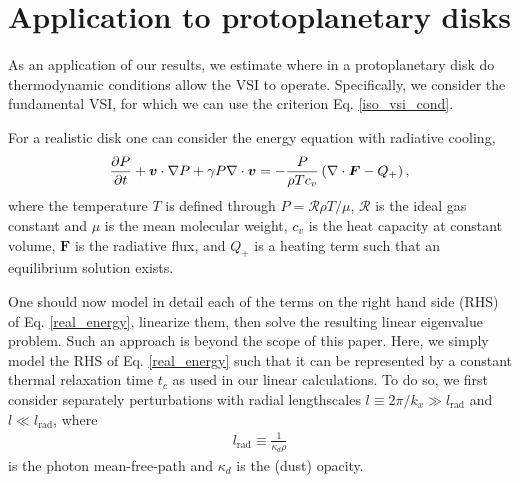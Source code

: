 \section{Application to protoplanetary disks}\label{application} 
As an application of our results, we estimate where in a 
protoplanetary disk do thermodynamic conditions allow the VSI to 
operate. Specifically, we consider the fundamental VSI, 
for which we can use the criterion Eq. \ref{iso_vsi_cond}.   

For a realistic disk one can consider the energy equation with
radiative cooling, 
\begin{align}\label{real_energy}
\frac{\partial P}{\partial t} + \bm{v}\cdot\nabla P +\gamma P \nabla\cdot\bm{v} = - \frac{P}{\rho T
  c_v}\left(\nabla\cdot\bm{F} - Q_+\right), 
\end{align}where the temperature $T$ is defined through $P=\mathcal{R}\rho
T/\mu$, $\mathcal{R}$ is the ideal gas constant and $\mu$ is
the mean molecular weight, $c_v$ is the heat capacity at constant
volume, 
$\bm{F}$ is the radiative flux, and $Q_+$ is a heating
term such that an equilibrium solution exists. 

One should now model in detail each of the terms on the right
hand side (RHS) of Eq. \ref{real_energy}, linearize them, then solve
the resulting linear eigenvalue problem. Such an approach is beyond
the scope of this paper. Here, we simply model the RHS of
Eq. \ref{real_energy} such that it can be represented by a constant
thermal relaxation time $t_c$ as used in our linear calculations.  
To do so, we first consider separately perturbations
with radial lengthscales $l\equiv 2\pi/k_x\gg l_\mathrm{rad}$ and 
$l\ll l_\mathrm{rad}$, where      
\begin{align}\label{lrad}
  l_\mathrm{rad} \equiv \frac{1}{\kappa_d\rho} 
\end{align} 
is the photon mean-free-path and $\kappa_d$ is the (dust) opacity. 

